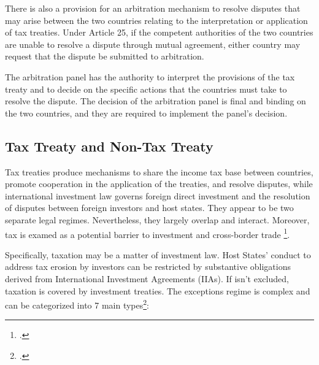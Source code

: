 There is also a provision for an arbitration mechanism to resolve disputes that may arise between the two countries relating to the interpretation or application of tax treaties.
Under Article 25, if the competent authorities of the two countries are unable to resolve a dispute through mutual agreement, either country may request that the dispute be submitted to arbitration. 


The arbitration panel has the authority to interpret the provisions of the tax treaty and to decide on the specific actions that the countries must take to resolve the dispute. The decision of the arbitration panel is final and binding on the two countries, and they are required to implement the panel's decision.

\subsection{Tax Treaty and Non-Tax Treaty}

Tax treaties produce mechanisms to share the income tax base between countries, promote cooperation in the application of the treaties, and resolve disputes, while international investment law governs foreign direct investment and the resolution of disputes between foreign investors and host states. They appear to be two separate legal regimes. Nevertheless, they largely overlap and interact. Moreover, tax is examed as a potential barrier to investment and cross-border trade \footcite{Chaisse2016}.

Specifically, taxation may be a matter of investment law. Host States' conduct to address tax erosion by investors can be restricted by substantive obligations derived from International Investment Agreements (IIAs). If isn't excluded, taxation is covered by investment treaties. The exceptions regime is complex and can be categorized into 7 main types\footcite[16]{Chaisse2016}:

